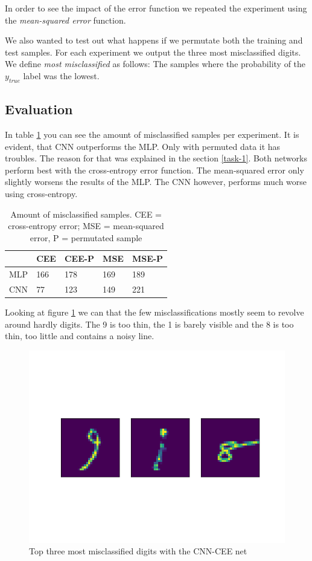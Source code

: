 \documentclass{article}
\begin{document}
In order to see the impact of the error function we repeated the experiment using the \textit{mean-squared error} function.

We also wanted to test out what happens if we permutate both the training and test samples.
For each experiment we output the three most misclassified digits.
We define \textit{most misclassified} as follows: The samples where the probability of the $y_{true}$ label was the lowest.

\subsection{Evaluation}

In table \ref{table-1} you can see the amount of misclassified samples per experiment.
It is evident, that CNN outperforms the MLP.
Only with permuted data it has troubles.
The reason for that was explained in the section \ref{task-1}.
Both networks perform best with the cross-entropy error function.
The mean-squared error only slightly worsens the results of the MLP.
The CNN however, performs much worse using cross-entropy.

\begin{table}[]
	\centering
	\begin{tabular}{|l|l|l|l|l|}
		\hline
		& \cellcolor[HTML]{C0C0C0}CEE & \cellcolor[HTML]{C0C0C0}CEE-P & \cellcolor[HTML]{C0C0C0}MSE & \cellcolor[HTML]{C0C0C0}MSE-P \\ \hline
		\cellcolor[HTML]{C0C0C0}MLP & \cellcolor[HTML]{FFFFFF}166 & 178                           & 169                         & 189                           \\ \hline
		\cellcolor[HTML]{C0C0C0}CNN & 77                          & 123                           & 149                         & 221                           \\ \hline
	\end{tabular}
	\caption{Amount of misclassified samples. CEE = cross-entropy error; MSE = mean-squared error, P = permutated sample}
	\label{table-1}
\end{table}

Looking at figure \ref{fig:cnn} we can that the few misclassifications mostly seem to revolve around hardly digits.
The 9 is too thin, the 1 is barely visible and the 8 is too thin, too little and contains a noisy line.

\begin{figure}[H]
	\centering
	\includegraphics[width=0.5\linewidth]{img/cnn_categorial_cross_non_perm.png}
	\caption{Top three most misclassified digits with the CNN-CEE net}
	\label{fig:cnn}
\end{figure}
\end{document}
